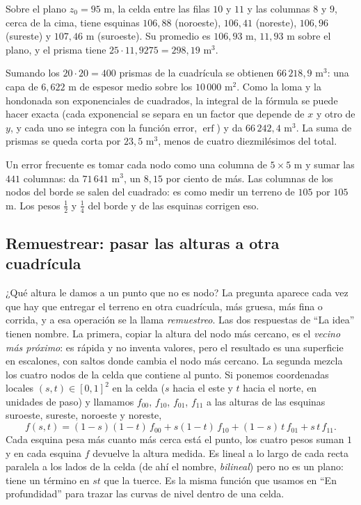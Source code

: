 \begin{ejemplo}\label{ej:terreno-volumen}
Sobre el plano \(z_0=95\) m, la celda entre las filas \(10\) y \(11\) y las columnas \(8\) y \(9\),
cerca de la cima, tiene esquinas \(106{,}88\) (noroeste), \(106{,}41\) (noreste), \(106{,}96\)
(sureste) y \(107{,}46\) m (suroeste). Su promedio es \(106{,}93\) m, \(11{,}93\) m sobre el plano, y
el prisma tiene \(25\cdot11{,}9275=298{,}19\) m\(^3\).

Sumando los \(20\cdot20=400\) prismas de la cuadrícula se obtienen \(66\,218{,}9\) m\(^3\): una
capa de \(6{,}622\) m de espesor medio sobre los \(10\,000\) m\(^2\). Como la loma y la hondonada son
exponenciales de cuadrados, la integral de la fórmula se puede hacer exacta (cada exponencial se
separa en un factor que depende de \(x\) y otro de \(y\), y cada uno se integra con la función
error, \(\operatorname{erf}\)) y da \(66\,242{,}4\) m\(^3\). La suma de prismas se queda corta por
\(23{,}5\) m\(^3\), menos de cuatro diezmilésimos del total.

Un error frecuente es tomar cada nodo como una columna de \(5\times5\) m y sumar las \(441\)
columnas: da \(71\,641\) m\(^3\), un \(8{,}15\) por ciento de más. Las columnas de los nodos del borde
se salen del cuadrado: es como medir un terreno de \(105\) por \(105\) m. Los pesos \(\tfrac12\) y
\(\tfrac14\) del borde y de las esquinas corrigen eso.
\end{ejemplo}

\subsection{Remuestrear: pasar las alturas a otra cuadrícula}\label{sec:terreno-remuestreo}

¿Qué altura le damos a un punto que no es nodo? La pregunta aparece cada vez que hay que
entregar el terreno en otra cuadrícula, más gruesa, más fina o corrida, y a esa operación se la
llama \emph{remuestreo}. Las dos respuestas de \enquote{La idea} tienen nombre. La primera,
copiar la altura del nodo más cercano, es el \emph{vecino más próximo}: es rápida y no inventa
valores, pero el resultado es una superficie en escalones, con saltos donde cambia el nodo más
cercano. La segunda mezcla los cuatro nodos de la celda que contiene al punto. Si ponemos
coordenadas locales \((s,t)\in[0,1]^2\) en la celda (\(s\) hacia el este y \(t\) hacia el norte, en
unidades de paso) y llamamos \(f_{00}\), \(f_{10}\), \(f_{01}\), \(f_{11}\) a las alturas de las
esquinas suroeste, sureste, noroeste y noreste,
\[
  f(s,t)=(1-s)(1-t)\,f_{00}+s(1-t)\,f_{10}+(1-s)\,t\,f_{01}+s\,t\,f_{11}.
\]
Cada esquina pesa más cuanto más cerca está el punto, los cuatro pesos suman \(1\) y en cada
esquina \(f\) devuelve la altura medida. Es lineal a lo largo de cada recta paralela a los
lados de la celda (de ahí el nombre, \emph{bilineal}) pero no es un plano: tiene un término en
\(st\) que la tuerce. Es la misma función que usamos en \enquote{En profundidad} para trazar las
curvas de nivel dentro de una celda.

